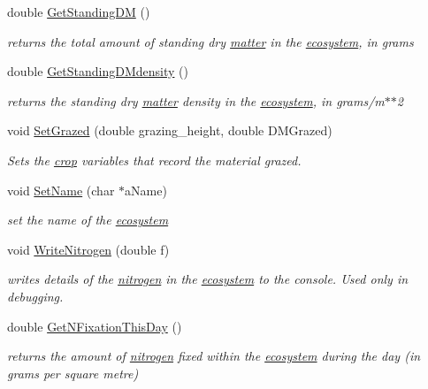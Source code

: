 \begin{DoxyCompactItemize}
double \hyperlink{classecosystem_a19d2a4505dee6b26659406de948dc0af}{GetStandingDM} ()
\begin{DoxyCompactList}\small\item\em returns the total amount of standing dry \hyperlink{classmatter}{matter} in the \hyperlink{classecosystem}{ecosystem}, in grams \item\end{DoxyCompactList}\item 
double \hyperlink{classecosystem_a34f12fd834cd50eef38b2c0bfae4b0fa}{GetStandingDMdensity} ()
\begin{DoxyCompactList}\small\item\em returns the standing dry \hyperlink{classmatter}{matter} density in the \hyperlink{classecosystem}{ecosystem}, in grams/m$\ast$$\ast$2 \item\end{DoxyCompactList}\item 
void \hyperlink{classecosystem_af86ff12086792509461b7ada09a1572e}{SetGrazed} (double grazing\_\-height, double DMGrazed)
\begin{DoxyCompactList}\small\item\em Sets the \hyperlink{classcrop}{crop} variables that record the material grazed. \item\end{DoxyCompactList}\item 
void \hyperlink{classecosystem_a59d0051172bd35dfd8d3189b0cd5d490}{SetName} (char $\ast$aName)
\begin{DoxyCompactList}\small\item\em set the name of the \hyperlink{classecosystem}{ecosystem} \item\end{DoxyCompactList}\item 
void \hyperlink{classecosystem_a0fb0b24e9d254fd625f42b881afbebc7}{WriteNitrogen} (double f)
\begin{DoxyCompactList}\small\item\em writes details of the \hyperlink{classnitrogen}{nitrogen} in the \hyperlink{classecosystem}{ecosystem} to the console. Used only in debugging. \item\end{DoxyCompactList}\item 
double \hyperlink{classecosystem_a3dbc48b9f16c1e7e0b8f6aa7aef3ea83}{GetNFixationThisDay} ()
\begin{DoxyCompactList}\small\item\em returns the amount of \hyperlink{classnitrogen}{nitrogen} fixed within the \hyperlink{classecosystem}{ecosystem} during the day (in grams per square metre) \item\end{DoxyCompactList}\item 

\end{DoxyCompactItemize}
